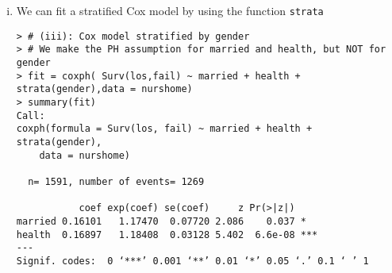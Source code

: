 \begin{enumerate}[(i)]
\begin{spacing}{1.2}
\begin{footnotesize}
\begin{verbatim}
  1   2   3   4 
260  81 126  42 
> 
> # Decode hlthsex as a factor variable
> nurshome2$hlthsex = factor(nurshome2$hlthsex,levels = 1:4,
+                            labels = c("Healthier Women","Healthier Men","Sicker Women" 
+                                       ,"Sicker Men"))
> # Fit KM curves
> fitKMgr = survfit( Surv(los,fail) ~ hlthsex,data = nurshome2)
> 
> # Let's have a look at the median survival times
> quantile(fitKMgr,probs = 0.5,conf.int = F)
                           50
hlthsex=Healthier Women 155.5
hlthsex=Healthier Men   100.0
hlthsex=Sicker Women     63.0
hlthsex=Sicker Men       30.0
> 
> pdf("KMhlthsex.pdf",height = 5.5,width = 5.5)
> plot(fitKMgr,mark.time = F,fun = "cloglog",ylab = "-Ln[-Ln(Survival Probabilities)]",
+      xlab = "Length of Stay (days in log-scale)",lty = 1:4,
+      col = c("blue","red","green","orange"),
+      main = "Evaluation of PH Assumption \nBy Categories of health-sex")
> legend("topleft",lty = 1:4,col = c("blue","red","green","orange"),bty = "n",
+        legend = c("Healthier Women","Healthier Men","Sicker Women","Sicker Men"))
> dev.off()
RStudioGD 
        2 
\end{verbatim}
\end{footnotesize}
\end{spacing}
\newpage
The differences between the above curves have a consistent sign during the majority of the follow-up. However, we can see that later in the study some groups cross. Thus, we may need a formal test to decide if the PH assumption holds.
\begin{figure}
	\centering
		\texttt{[image: KMhlthsex.pdf]}
	\caption{Evaluation of PH Assumption By Categories of health-sex.}
	\label{figure5}
\end{figure} 
\item We can fit a stratified Cox model by using the function \verb|strata|
\begin{spacing}{1.2}
\begin{footnotesize}
\begin{verbatim}
> # (iii): Cox model stratified by gender
> # We make the PH assumption for married and health, but NOT for gender
> fit = coxph( Surv(los,fail) ~ married + health + strata(gender),data = nurshome)
> summary(fit)
Call:
coxph(formula = Surv(los, fail) ~ married + health + strata(gender), 
    data = nurshome)

  n= 1591, number of events= 1269 

           coef exp(coef) se(coef)     z Pr(>|z|)    
married 0.16101   1.17470  0.07720 2.086    0.037 *  
health  0.16897   1.18408  0.03128 5.402  6.6e-08 ***
---
Signif. codes:  0 ‘***’ 0.001 ‘**’ 0.01 ‘*’ 0.05 ‘.’ 0.1 ‘ ’ 1


\end{verbatim}
\end{footnotesize}
\end{spacing}
\end{enumerate}
